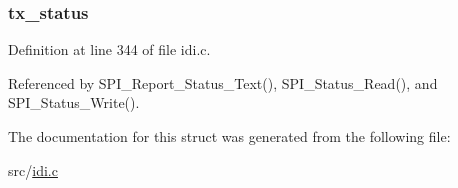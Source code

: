 \hypertarget{structspi__status_a234b821e581a221369b67154e3e7cfa8}{
\subsubsection[{tx\+\_\+status}]{ tx\+\_\+status}}\label{structspi__status_a234b821e581a221369b67154e3e7cfa8}


Definition at line 344 of file idi.\+c.



Referenced by S\+P\+I\+\_\+\+Report\+\_\+\+Status\+\_\+\+Text(), S\+P\+I\+\_\+\+Status\+\_\+\+Read(), and S\+P\+I\+\_\+\+Status\+\_\+\+Write().



The documentation for this struct was generated from the following file\+:\begin{DoxyCompactItemize}
\item 
src/\hyperlink{idi_8c}{idi.\+c}\end{DoxyCompactItemize}

